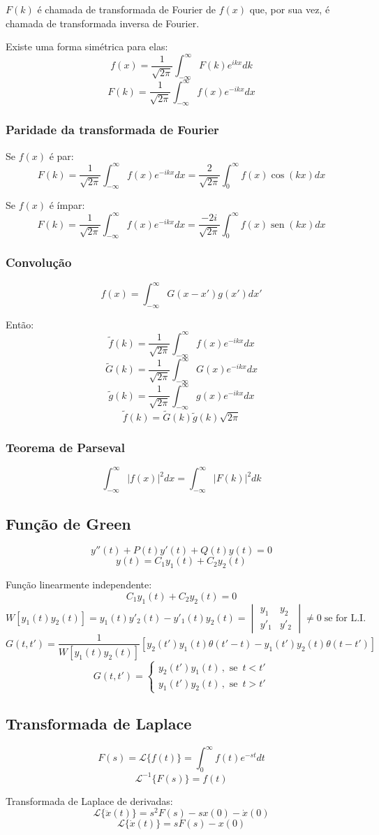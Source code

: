 \documentclass[a4paper,12pt]{article}
\DeclareMathOperator{\sen}{sen}
\newcommand{\integral}{\displaystyle\int}
\begin{document}
$F(k)$ é chamada de transformada de Fourier de $f(x)$ que, por sua vez, é chamada de transformada inversa de Fourier.

Existe uma forma simétrica para elas:
$$f(x) = \dfrac{1}{\sqrt{2\pi}}\integral_{-\infty}^{\infty} F(k)e^{ikx}dk$$
$$F(k) = \dfrac{1}{\sqrt{2\pi}}\integral_{-\infty}^{\infty} f(x)e^{-ikx}dx$$
\subsubsection{Paridade da transformada de Fourier}
Se $f(x)$ é par:
$$F(k) = \dfrac{1}{\sqrt{2\pi}}\integral_{-\infty}^{\infty} f(x)e^{-ikx}dx 
= \dfrac{2}{\sqrt{2\pi}}\integral_{0}^{\infty} f(x) \cos(kx)dx$$

Se $f(x)$ é ímpar:
$$F(k) = \dfrac{1}{\sqrt{2\pi}}\integral_{-\infty}^{\infty} f(x)e^{-ikx}dx 
= \dfrac{-2i}{\sqrt{2\pi}}\integral_{0}^{\infty} f(x) \sen(kx)dx$$
\subsubsection{Convolução}
$$f(x) = \integral_{-\infty}^{\infty} G(x-x')g(x')dx'$$

Então:
$$\tilde{f}(k) = \dfrac{1}{\sqrt{2\pi}}\integral_{-\infty}^{\infty} f(x)e^{-ikx}dx$$
$$\tilde{G}(k) = \dfrac{1}{\sqrt{2\pi}}\integral_{-\infty}^{\infty} G(x)e^{-ikx}dx$$
$$\tilde{g}(k) = \dfrac{1}{\sqrt{2\pi}}\integral_{-\infty}^{\infty} g(x)e^{-ikx}dx$$
$$\tilde{f}(k) = \tilde{G}(k)\tilde{g}(k)\sqrt{2\pi}$$
\subsubsection{Teorema de Parseval}
$$\integral_{-\infty}^{\infty} |f(x)|^2dx = \integral_{-\infty}^{\infty} |F(k)|^2dk$$

\subsection{Função de Green}
$$y''(t)+P(t)y'(t)+Q(t)y(t)=0$$
$$y(t)=C_1y_1(t)+C_2y_2(t)$$

Função linearmente independente:
$$C_1y_1(t)+C_2y_2(t)=0$$
$$W[y_1(t)y_2(t)]=y_1(t)y'_2(t)-y'_1(t)y_2(t)=
\begin{vmatrix}
y_1 & y_2 \\
y'_1 & y'_2
\end{vmatrix}
\neq 0 \;\textrm{se for L.I.}
$$
$$G(t,t') = \dfrac{1}{W[y_1(t)y_2(t)]} [y_2(t')y_1(t)\theta (t'-t) -y_1(t')y_2(t)\theta (t-t')]$$
 $$G(t,t') =
  \begin{cases}
   y_2(t')y_1(t)\,,\textrm{ se }\,t < t'\\
   y_1(t')y_2(t)\,,\textrm{ se }\,t > t'
  \end{cases}
 $$

\subsection{Transformada de Laplace}
$$F(s) = \mathcal{L} \{f(t)\} = \integral_{0}^{\infty} f(t)e^{-st}dt$$
$$\mathcal{L}^{-1}\{F(s)\} = f(t)$$

Transformada de Laplace de derivadas:
$$\mathcal{L}\{\ddot{x}(t)\} = s^2F(s) - sx(0)-\dot{x}(0)$$
$$\mathcal{L}\{\dot{x}(t)\} = sF(s) - x(0)$$
\end{document}
